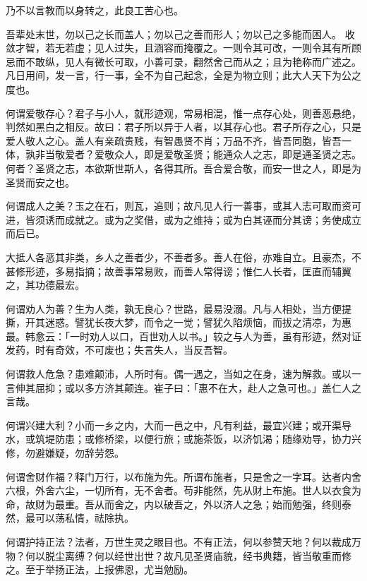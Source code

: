 \documentclass[12pt,twoside,openany]{book}
\begin{document}
乃不以言教而以身转之，此良工苦心也。

吾辈处末世，勿以己之长而盖人；勿以己之善而形人；勿以己之多能而困人。 收敛才智，若无若虚；见人过失，且涵容而掩覆之。一则令其可改，一则令其有所顾忌而不敢纵，见人有微长可取，小善可录，翻然舍己而从之；且为艳称而广述之。凡日用间，发一言，行一事，全不为自己起念，全是为物立则；此大人天下为公之度也。

何谓爱敬存心？君子与小人，就形迹观，常易相混，惟一点存心处，则善恶悬绝，判然如黑白之相反。故曰：君子所以异于人者，以其存心也。君子所存之心，只是爱人敬人之心。盖人有亲疏贵贱，有智愚贤不肖；万品不齐，皆吾同胞，皆吾一体，孰非当敬爱者？爱敬众人，即是爱敬圣贤；能通众人之志，即是通圣贤之志。何者？圣贤之志，本欲斯世斯人，各得其所。吾合爱合敬，而安一世之人，即是为圣贤而安之也。

何谓成人之美？玉之在石，则瓦，追则；故凡见人行一善事，或其人志可取而资可进，皆须诱而成就之。或为之奖借，或为之维持；或为白其诬而分其谤；务使成立而后已。

大抵人各恶其非类，乡人之善者少，不善者多。善人在俗，亦难自立。且豪杰，不甚修形迹，多易指摘；故善事常易败，而善人常得谤；惟仁人长者，匡直而辅翼之，其功德最宏。

何谓劝人为善？生为人类，孰无良心？世路，最易没溺。凡与人相处，当方便提撕，开其迷惑。譬犹长夜大梦，而令之一觉；譬犹久陷烦恼，而拔之清凉，为惠最。韩愈云：「一时劝人以口，百世劝人以书。」较之与人为善，虽有形迹，然对证发药，时有奇效，不可废也；失言失人，当反吾智。

何谓救人危急？患难颠沛，人所时有。偶一遇之，当如之在身，速为解救。或以一言伸其屈抑；或以多方济其颠连。崔子曰：「惠不在大，赴人之急可也。」盖仁人之言哉。

何谓兴建大利？小而一乡之内，大而一邑之中，凡有利益，最宜兴建；或开渠导水，或筑堤防患；或修桥梁，以便行旅；或施茶饭，以济饥渴；随缘劝导，协力兴修，勿避嫌疑，勿辞劳怨。

何谓舍财作福？释门万行，以布施为先。所谓布施者，只是舍之一字耳。达者内舍六根，外舍六尘，一切所有，无不舍者。苟非能然，先从财上布施。世人以衣食为命，故财为最重。吾从而舍之，内以破吾之，外以济人之急；始而勉强，终则泰然，最可以荡私情，祛除执。

何谓护持正法？法者，万世生灵之眼目也。不有正法，何以参赞天地？何以裁成万物？何以脱尘离缚？何以经世出世？故凡见圣贤庙貌，经书典籍，皆当敬重而修之。至于举扬正法，上报佛恩，尤当勉励。
\end{document}
